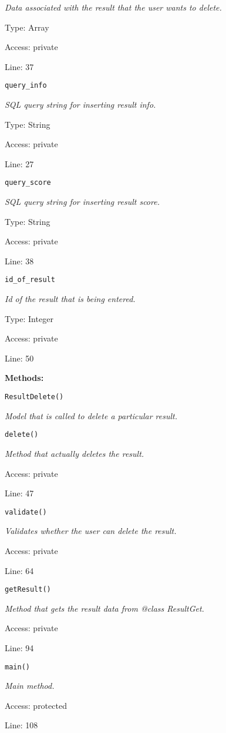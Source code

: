 {\scriptsize
\textit{Data associated with the result that the user wants to delete.}

Type: Array

Access: private

Line: 37

}
\texttt{query\_info}

{\scriptsize
\textit{SQL query string for inserting result info.}

Type: String

Access: private

Line: 27

}
\texttt{query\_score}

{\scriptsize
\textit{SQL query string for inserting result score.}

Type: String

Access: private

Line: 38

}
\texttt{id\_of\_result}

{\scriptsize
\textit{Id of the result that is being entered.}

Type: Integer

Access: private

Line: 50

}
\textbf{Methods:}

\texttt{ResultDelete()}

{\scriptsize
\textit{Model that is called to delete a particular result.}

}

\texttt{delete()}

{\scriptsize
\textit{Method that actually deletes the result.}

Access: private

Line: 47

}

\texttt{validate()}

{\scriptsize
\textit{Validates whether the user can delete the result.}

Access: private

Line: 64

}

\texttt{getResult()}

{\scriptsize
\textit{Method that gets the result data from @class ResultGet.}

Access: private

Line: 94

}

\texttt{main()}

{\scriptsize
\textit{Main method.}

Access: protected

Line: 108

}

